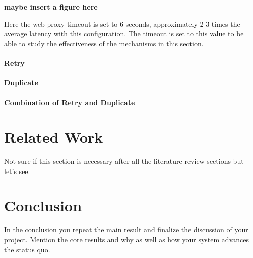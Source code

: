 \documentclass[a4paper,11pt,oneside]{report}
\begin{document}
\textbf{maybe insert a figure here}

Here the web proxy timeout is set to 6 seconds, approximately 2-3 times the average latency with this configuration. The timeout is set to this value to be able to study the effectiveness of the mechanisms in this section.
\subsubsection{Retry}

\subsubsection{Duplicate}

\subsubsection{Combination of Retry and Duplicate}


\chapter{Related Work}



Not sure if this section is necessary after all the literature review sections but let's see.

\chapter{Conclusion}

In the conclusion you repeat the main result and finalize the discussion of
your project. Mention the core results and why as well as how your system
advances the status quo.

\cleardoublepage
{}
{}
\printbibliography

%
%
\end{document}

